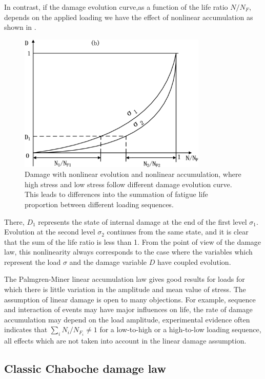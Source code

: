 In contrast, if the damage evolution curve,as a function of the life ratio $N/N_F$, depends on the applied loading we have the effect of nonlinear accumulation as shown in . 
\begin{figure}[!h]
	\centering
	\includegraphics[width=0.8\textwidth]{figures//nonlinearaccumulation.png} 
	\caption{Damage with nonlinear evolution and nonlinear accumulation, where high stress and low stress follow different damage evolution curve. This leads to differences into the summation of fatigue life proportion between different loading sequences.}
	\label{nonlinear accumulation}
\end{figure}
There, $D_1$ represents the state of internal damage at the end of the first level $\sigma_1$. Evolution at the second level $\sigma_2$ continues from the same state, and it is clear that the sum of the life ratio is less than 1. From the point of view of the damage law, this nonlinearity always corresponds to the case where the variables which represent the load $\sigma$ and the damage variable $D$ have coupled evolution.

The Palmgren-Miner linear accumulation law gives good results for loads for which there is little variation in the amplitude and mean value of stress. The assumption of linear damage is open to many objections. For example, sequence and interaction of events may have major influences on life, the rate of damage accumulation may depend on the load amplitude, experimental evidence often indicates that $\sum_{i}N_i/N_{F_i}\neq 1$ for a low-to-high or a high-to-low loading sequence, all effects which are not taken into account in the linear damage assumption.

\newpage
\subsection{Classic Chaboche damage law}

